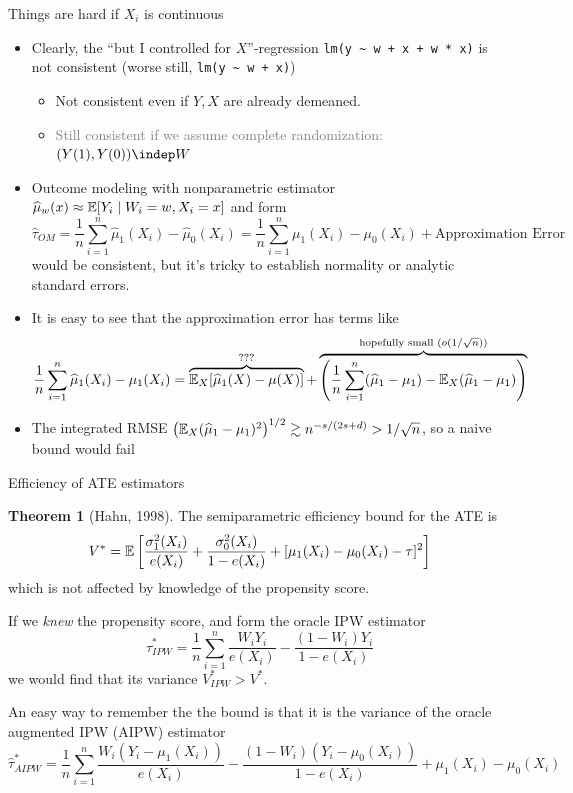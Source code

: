 \documentclass[10pt,aspectratio=169,handout]{beamer}
\theoremstyle{definition}
\newtheorem{thm}{Theorem}
\newcommand{\light}[1]{\textcolor{gray}{#1}}
\begin{document}
\begin{frame}{Things are hard if $X_i$ is continuous}
\small
  \begin{itemize}
    \item Clearly, the ``but I controlled for $X$''-regression \texttt{lm(y
    \textasciitilde{} w + x + w * x)} is not consistent (worse still, 
    \texttt{lm(y
    \textasciitilde{} w + x)})
    \begin{itemize}
    \item Not consistent even if $Y,X$ are already demeaned.
      \item \light{Still consistent if we assume complete randomization: $
      (Y
      (1),
                  Y(0)) \indep W$}
    \end{itemize}
    \item Outcome modeling with nonparametric estimator $\widehat \mu_w(x)
    \approx \mathbb{E}[Y_i \mid W_i=w, X_i=x]$ and form \[
    \hat\tau_{OM} = \frac{1}{n}\sum_{i=1}^n \hat\mu_1(X_i) - \hat\mu_0
    (X_i) = \frac{1}{n}\sum_{i=1}^n \mu_1(X_i) - \mu_0(X_i) + 
    \text{Approximation Error}
    \]
    would be consistent, but it's tricky to establish normality or
    analytic standard errors.
    \item It is easy
    to see that the approximation error has
    terms like \[
    \frac{1}{n}\sum_{i=1}^n \widehat \mu_1(X_i) - \mu_1(X_i) = \overbrace{\mathbb{E}_
    {X}[\widehat
        \mu_1(X) - \mu(X)]}^{???} + \overbrace{\left({\frac{1}{n}\sum_{i=1}^n 
        (\widehat \mu_1
    - \mu_1) -
        \mathbb{E}_X(\widehat \mu_1 - \mu_1)}\right)}^{\text{hopefully small ($o(1/
        \sqrt{n})$)}}
    \]
    \item The integrated RMSE $\left({\mathbb{E}_X(\widehat \mu_1 - \mu_1)^2}\right)^{1/2}
    \gtrsim n^{-s/(2s+d)} > 1/\sqrt{n}$, so a naive bound would fail
  \end{itemize}
\end{frame}

\begin{frame}{Efficiency of ATE estimators}
\small
  \begin{thm}[Hahn, 1998]
    The semiparametric efficiency bound for the ATE is \[
    V^* = \mathbb{E}\left[{\frac{\sigma_1^2(X_i)}{e(X_i)} + \frac{\sigma_0^2(X_i)}
    {1-e(X_i)} + [\mu_1(X_i) - \mu_0(X_i) - \tau]^2}\right]
    \]
    which is \alert{not} affected by knowledge of the propensity score. 
  \end{thm}
  
  If we \emph{knew} the propensity score, and form the \alert{oracle IPW}
  estimator\[
  \hat\tau_{IPW}^* = \frac{1}{n}\sum_{i=1}^n \frac{W_i Y_i}{e(X_i)} - 
  \frac{(1-W_i)Y_i}{1-e(X_i)}
  \]
  we would find that its variance $V_{IPW}^* > V^*$. 
  
   An easy way to
  remember the the bound is that it is the variance of the oracle 
  \alert{augmented} IPW (AIPW) estimator \[
  \hat\tau^*_{AIPW} = \frac{1}{n}\sum_{i=1}^n \frac{W_i(Y_i-\mu_1(X_i))}{e
  (X_i)} - \frac{(1-W_i)(Y_i-\mu_0(X_i))}{1-e
  (X_i)} + \mu_1(X_i) - \mu_0(X_i)
  \]
  
\end{frame}
\end{document}
